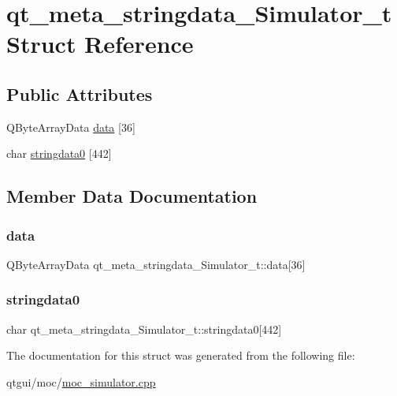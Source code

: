 \hypertarget{structqt__meta__stringdata___simulator__t}{}\section{qt\+\_\+meta\+\_\+stringdata\+\_\+\+Simulator\+\_\+t Struct Reference}
\label{structqt__meta__stringdata___simulator__t}
\subsection*{Public Attributes}
\begin{DoxyCompactItemize}
\item 
Q\+Byte\+Array\+Data \mbox{\hyperlink{structqt__meta__stringdata___simulator__t_a90ad785493d470fe0f3f885c76e63c09}{data}} \mbox{[}36\mbox{]}
\item 
char \mbox{\hyperlink{structqt__meta__stringdata___simulator__t_adae7f283e852b7b4eed25c1fb669a06b}{stringdata0}} \mbox{[}442\mbox{]}
\end{DoxyCompactItemize}


\subsection{Member Data Documentation}
\mbox{\label{structqt__meta__stringdata___simulator__t_a90ad785493d470fe0f3f885c76e63c09}} 
\subsubsection{\texorpdfstring{data}{data}}
{\footnotesize\ttfamily Q\+Byte\+Array\+Data qt\+\_\+meta\+\_\+stringdata\+\_\+\+Simulator\+\_\+t\+::data\mbox{[}36\mbox{]}}

\mbox{\label{structqt__meta__stringdata___simulator__t_adae7f283e852b7b4eed25c1fb669a06b}} 
\subsubsection{\texorpdfstring{stringdata0}{stringdata0}}
{\footnotesize\ttfamily char qt\+\_\+meta\+\_\+stringdata\+\_\+\+Simulator\+\_\+t\+::stringdata0\mbox{[}442\mbox{]}}



The documentation for this struct was generated from the following file\+:\begin{DoxyCompactItemize}
\item 
qtgui/moc/\mbox{\hyperlink{moc__simulator_8cpp}{moc\+\_\+simulator.\+cpp}}\end{DoxyCompactItemize}
